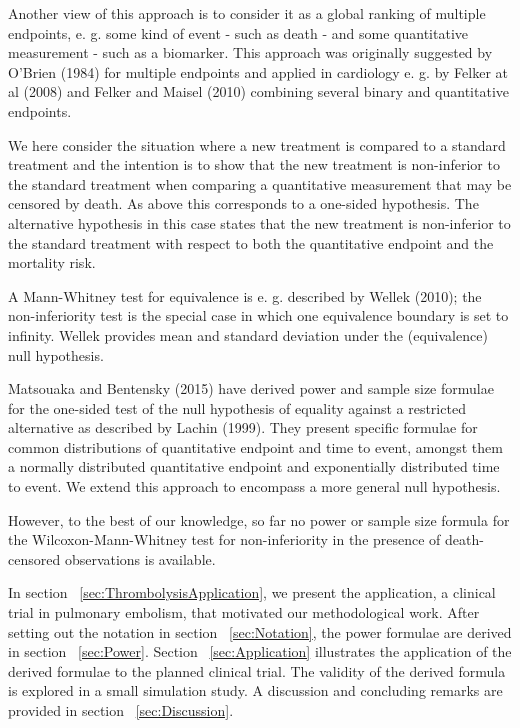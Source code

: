 \documentclass[bimj,fleqn]{w-art}\usepackage[]{graphicx}\usepackage[]{color}
\theoremstyle{plain}
\theoremstyle{definition}
\begin{document}
Another view of this approach is to consider it as a global ranking of
multiple endpoints, e. g. some kind of event - such as death - and some
quantitative measurement - such as a biomarker. This approach was originally
suggested by O'Brien (1984) for multiple endpoints and applied in cardiology
e. g. by Felker at al (2008) and Felker and Maisel (2010) combining several
binary and quantitative endpoints.

We here consider the situation where a new treatment is compared to a standard
treatment and the intention is to show that the new treatment is non-inferior
to the standard treatment when comparing a quantitative measurement that may
be censored by death. As above this corresponds to a one-sided hypothesis.
The alternative hypothesis in this case states that the new treatment is
non-inferior to the standard treatment with respect to both the quantitative
endpoint and the mortality risk.

A Mann-Whitney test for equivalence is e. g. described by Wellek (2010); the
non-inferiority test is the special case in which one equivalence boundary is set
to infinity. Wellek provides mean and standard deviation under the (equivalence)
null hypothesis.

Matsouaka and Bentensky (2015) have derived power and sample size formulae for
the one-sided test of the null hypothesis of equality against a restricted
alternative as described by Lachin (1999). They present specific formulae for
common distributions of quantitative endpoint and time to event, amongst them
a normally distributed quantitative endpoint and exponentially distributed
time to event. We extend this approach to encompass a more general null
hypothesis.

However, to the best of our knowledge, so far no power or sample size formula
for the Wilcoxon-Mann-Whitney test for non-inferiority in the presence of
death-censored observations is available.

In section ~\ref{sec:ThrombolysisApplication}, we present the
application, a clinical trial in pulmonary embolism, that motivated our
methodological work. After setting out the notation in section
~\ref{sec:Notation}, the power formulae are derived in section ~\ref{sec:Power}.
Section ~\ref{sec:Application} illustrates the application of the derived
formulae to the planned clinical trial. The validity of the derived formula
is explored in a small simulation study. A discussion and concluding remarks
are provided in section ~\ref{sec:Discussion}.
\end{document}
